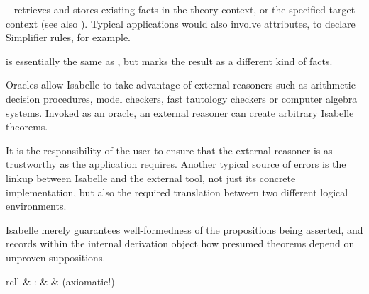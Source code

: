 \begin{isabellebody}
\begin{isamarkuptext}
\begin{description}
  \item \hyperlink{command.lemmas}{\mbox{}}~ retrieves and stores
  existing facts in the theory context, or the specified target
  context (see also ).  Typical applications would
  also involve attributes, to declare Simplifier rules, for example.
  
  \item \hyperlink{command.theorems}{\mbox{}} is essentially the same as \hyperlink{command.lemmas}{\mbox{}}, but marks the result as a different kind of facts.

  \end{description}%
\end{isamarkuptext}%
\isamarkuptrue%
%
\isamarkuptrue%
%
\begin{isamarkuptext}%
Oracles allow Isabelle to take advantage of external reasoners
  such as arithmetic decision procedures, model checkers, fast
  tautology checkers or computer algebra systems.  Invoked as an
  oracle, an external reasoner can create arbitrary Isabelle theorems.

  It is the responsibility of the user to ensure that the external
  reasoner is as trustworthy as the application requires.  Another
  typical source of errors is the linkup between Isabelle and the
  external tool, not just its concrete implementation, but also the
  required translation between two different logical environments.

  Isabelle merely guarantees well-formedness of the propositions being
  asserted, and records within the internal derivation object how
  presumed theorems depend on unproven suppositions.

  \begin{matharray}{rcll}
    \hypertarget{command.oracle}{\hyperlink{command.oracle}{\mbox{}}} & : &  & (axiomatic!) \\
  \end{matharray}


\end{isamarkuptext}
\end{isabellebody}
